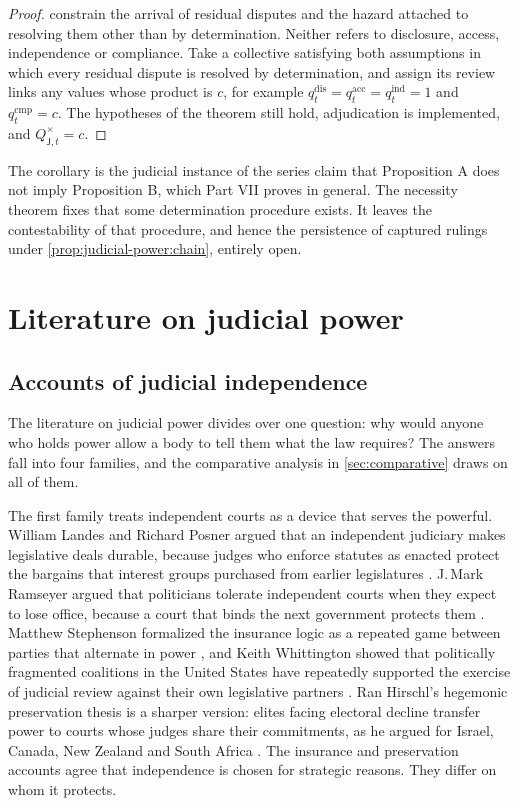 \documentclass[11pt,letterpaper]{article}
\theoremstyle{definition}
\theoremstyle{remark}
\newcommand{\pJ}{\mathsf{J}}
\newcommand{\Qchain}{Q^{\times}_{\pJ,t}}
\begin{document}
\begin{proof}
 constrain the arrival of residual disputes and the hazard attached to resolving them other than by determination. Neither refers to disclosure, access, independence or compliance. Take a collective satisfying both assumptions in which every residual dispute is resolved by determination, and assign its review links any values whose product is $c$, for example $q^{\mathrm{dis}}_t=q^{\mathrm{acc}}_t=q^{\mathrm{ind}}_t=1$ and $q^{\mathrm{cmp}}_t=c$. The hypotheses of the theorem still hold, adjudication is implemented, and $\Qchain=c$.
\end{proof}

The corollary is the judicial instance of the series claim that Proposition A does not imply Proposition B, which Part VII proves in general. The necessity theorem fixes that some determination procedure exists. It leaves the contestability of that procedure, and hence the persistence of captured rulings under \cref{prop:judicial-power:chain}, entirely open.

\section{Literature on judicial power}
\label{sec:literature}

\subsection{Accounts of judicial independence}

The literature on judicial power divides over one question: why would anyone who holds power allow a body to tell them what the law requires? The answers fall into four families, and the comparative analysis in \cref{sec:comparative} draws on all of them.

The first family treats independent courts as a device that serves the powerful. William Landes and Richard Posner argued that an independent judiciary makes legislative deals durable, because judges who enforce statutes as enacted protect the bargains that interest groups purchased from earlier legislatures \citep{landes1975}. J.\,Mark Ramseyer argued that politicians tolerate independent courts when they expect to lose office, because a court that binds the next government protects them \citep{ramseyer1994}. Matthew Stephenson formalized the insurance logic as a repeated game between parties that alternate in power \citep{stephenson2003}, and Keith Whittington showed that politically fragmented coalitions in the United States have repeatedly supported the exercise of judicial review against their own legislative partners \citep{whittington2005}. Ran Hirschl's hegemonic preservation thesis is a sharper version: elites facing electoral decline transfer power to courts whose judges share their commitments, as he argued for Israel, Canada, New Zealand and South Africa \citep{hirschl2001,hirschl2004}. The insurance and preservation accounts agree that independence is chosen for strategic reasons. They differ on whom it protects.
\end{document}

